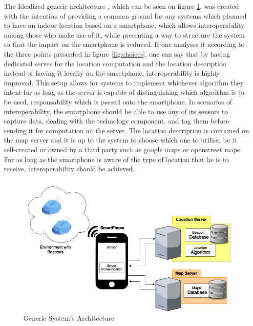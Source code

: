 \documentclass[a4paper]{IEEEtran}
\begin{document}
The Idealized generic architecture , which can be seen on figure \ref{fig:generic}, was created with the intention of providing a common ground for any systems which planned to have an indoor location based on a smartphone, which allows interoperability among those who make use of it, while presenting a way to structure the system so that the impact on the smartphone is reduced. If one analyses it according to the three points presented in figure \ref{fig:choices}, one can say that by having dedicated serves for the location computation and the location description instead of having it locally on the smartphone, interoperability is highly improved. This setup allows for systems to implement whichever algorithm they intent for as long as the server is capable of distinguishing which algorithm is to be used, responsability which is passed onto the smartphone. In scenarios of interoperability, the smartphone should be able to use any of its sensors to capture data, dealing with the technology component, and tag them before sending it for computation on the server. The location description is contained on the map server and it is up to the system to choose which one to utilise, be it self-created or owned by a third party such as google maps or openstreet maps. For as long as the smartphone is aware of the type of location that he is to receive, interoperability should be achieved.

\begin{figure}
	\centering
		\includegraphics[width=1\linewidth]{figures/generic.png}
	\caption[Generic System's Architecture]{Generic System's Architecture}
	\label{fig:generic}
\end{figure}

\end{document}
